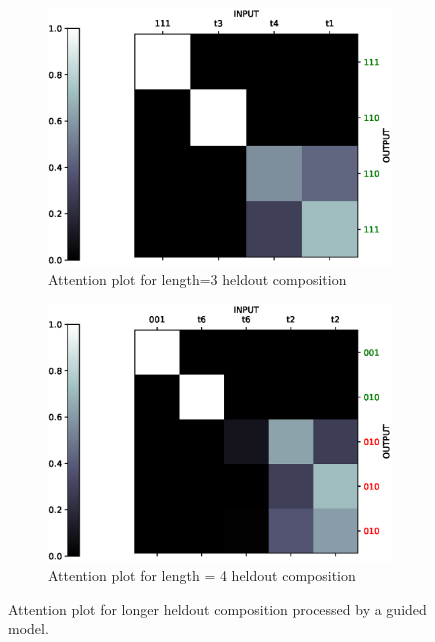 \begin{figure}[ht] 
	\begin{subfigure}[b]{0.5\linewidth}
		\centering
		\includegraphics[width=0.95\linewidth]{./figs/lookup/attn/longer2-eps}
		\caption{Attention plot for length=3 heldout composition} 
		\label{attn_longer1} 
		\vspace{2ex}
	\end{subfigure}%
	\begin{subfigure}[b]{0.5\linewidth}
		\centering
		\includegraphics[width=0.95\linewidth]{./figs/lookup/attn/longer1-eps}
		\caption{Attention plot for length = 4 heldout composition} 
		\label{attn_longer2} 
		\vspace{2ex}
	\end{subfigure}
	\caption{Attention plot for longer heldout composition processed by a guided model.}
	\label{attn_longer}
\end{figure}

